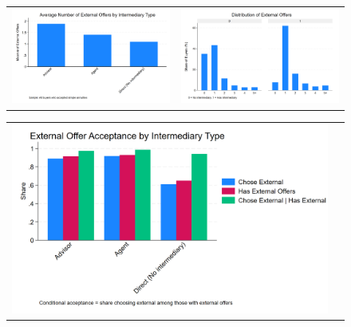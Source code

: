 \documentclass[12pt]{article}
\begin{document}
 
\begin{figure}[H]
\caption{}
 \label{fig:ie4_7and8}
\centering{}%
\begin{tabular}{cc}
\includegraphics[scale=0.17]{figures/IE4/IE4_external_offers_by_intermediary.png} & \includegraphics[scale=0.17]{figures/IE4/IE4_external_distribution_by_intermediary.png} 
\end{tabular}
\end{figure} 
 
\begin{figure}[H]
\caption{}
 \label{fig:ie4_9and10}
\centering{}%
\begin{tabular}{cc}
\includegraphics[scale=0.17]{figures/IE4/IE4_external_acceptance_by_intermediary.png} 
\end{tabular}
\end{figure} 
 
\end{document}
